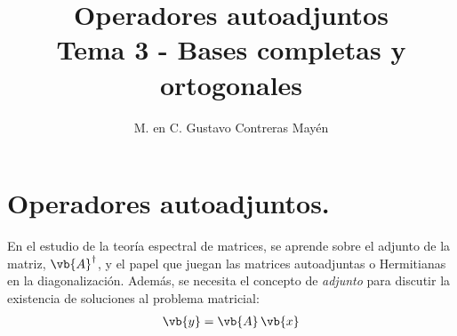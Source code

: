 
\title{Operadores autoadjuntos \\ \large {Tema 3 - Bases completas y ortogonales}\vspace{-3ex}}

\author{M. en C. Gustavo Contreras Mayén}
\date{ }

\pagestyle{fancy}
\fancyhf{}
\lhead{\leftmark}
\rfoot{\thepage}
\setlength{\headheight}{16pt}%



\maketitle
\fontsize{14}{14}\selectfont
\tableofcontents
\newpage

\section{Operadores autoadjuntos.}

En el estudio de la teoría espectral de matrices, se aprende sobre el adjunto de la matriz, $\vb{A}^{\dagger}$, y el papel que juegan las matrices autoadjuntas o Hermitianas en la diagonalización. Además, se necesita el concepto de \emph{adjunto} para discutir la existencia de soluciones al problema matricial:
\begin{align*}
\vb{y} = \vb{A} \, \vb{x}
\end{align*}

